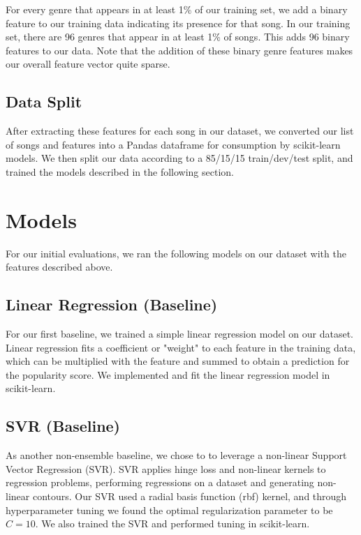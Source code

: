 \documentclass[journal]{IEEEtran}
\begin{document}
For every genre that appears in at least 1\% of our training set, we add a binary feature to our training data indicating its presence for that song. In our training set, there are 96 genres that appear in at least 1\% of songs. This adds 96 binary features to our data. Note that the addition of these binary genre features makes our overall feature vector quite sparse.

\subsection{Data Split}
After extracting these features for each song in our dataset, we converted our list of songs and features into a Pandas dataframe for consumption by scikit-learn models. We then split our data according to a 85/15/15 train/dev/test split, and trained the models described in the following section. \\


\section{Models}

For our initial evaluations, we ran the following models on our dataset with the features described above.

\subsection{Linear Regression (Baseline)}
For our first baseline, we trained a simple linear regression model on our dataset. Linear regression fits a coefficient or "weight" to each feature in the training data, which can be multiplied with the feature and summed to obtain a prediction for the popularity score. We implemented and fit the linear regression model in scikit-learn.

\subsection{SVR (Baseline)}
As another non-ensemble baseline, we chose to to leverage a non-linear Support Vector Regression (SVR). SVR applies hinge loss and non-linear kernels to regression problems, performing regressions on a dataset and generating non-linear contours. Our SVR used a radial basis function (rbf) kernel, and through hyperparameter tuning we found the optimal regularization parameter to be $C = 10$. We also trained the SVR and performed tuning in scikit-learn.
\end{document}
